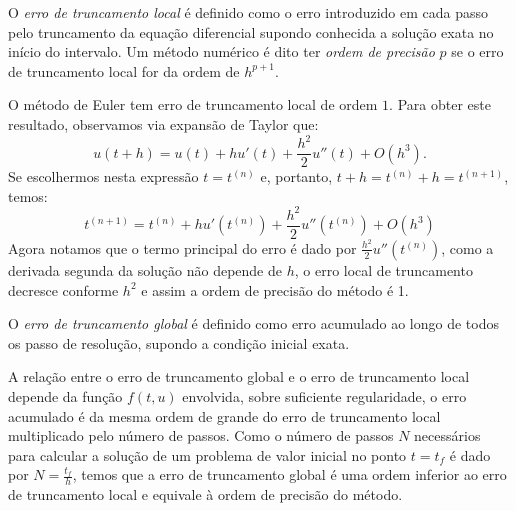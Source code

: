 \begin{defn} O \emph{erro de truncamento local} é definido como o erro introduzido em cada passo pelo truncamento da equação diferencial supondo conhecida a solução exata no início do intervalo. Um método numérico é dito ter \emph{ordem de precisão} $p$ se o erro de truncamento local for da ordem de $h^{p+1}$.
\end{defn}
\begin{ex} O método de Euler tem erro de truncamento local de ordem $1$. Para obter este resultado, observamos via expansão de Taylor que:
$$u(t+h)=u(t)+hu'(t)+\frac{h^2}{2}u''(t)+O(h^3).$$
Se escolhermos nesta expressão $t=t^{(n)}$ e, portanto, $t+h=t^{(n)}+h=t^{(n+1)}$, temos:
$$t^{(n+1)}=t^{(n)}+hu'(t^{(n)})+\frac{h^2}{2}u''(t^{(n)})+O(h^3)$$
Agora notamos que o termo principal do erro é dado por $\frac{h^2}{2}u''(t^{(n)})$, como a derivada segunda da solução não depende de $h$, o erro local de truncamento decresce conforme $h^2$ e assim a ordem de precisão do método é 1.
\end{ex}

\begin{defn} O \emph{erro de truncamento global} é definido como erro acumulado ao longo de todos os passo de resolução, supondo a condição inicial exata.
\end{defn}

A relação entre o erro de truncamento global e o erro de truncamento local depende da função $f(t,u)$ envolvida, sobre suficiente regularidade, o erro acumulado é da mesma ordem de grande do erro de truncamento local multiplicado pelo número de passos. Como o número de passos $N$ necessários para calcular a solução de um problema de valor inicial no ponto $t=t_{f}$ é dado por $N=\frac{t_f}{h}$, temos que a erro de truncamento global é uma ordem inferior ao erro de truncamento local e equivale à ordem de precisão do método.

